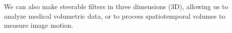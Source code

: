 %
%
%
%
%

We can also make steerable filters in three dimensions (3D), allowing us to analyze medical volumetric data, or to process spatiotemporal volumes to measure image motion.

%
%




